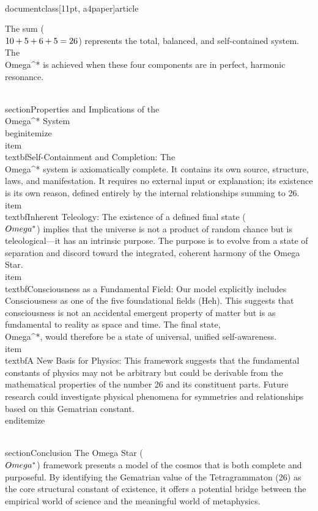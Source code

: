 \\documentclass[11pt, a4paper]{article}
\begin{document}
The sum (\\$10+5+6+5=26\\$) represents the total, balanced, and self-contained system. The \\Omega^* is achieved when these four components are in perfect, harmonic resonance.

\\section{Properties and Implications of the \\Omega^* System}
\\begin{itemize}
    \\item \\textbf{Self-Containment and Completion:} The \\Omega^* system is axiomatically complete. It contains its own source, structure, laws, and manifestation. It requires no external input or explanation; its existence is its own reason, defined entirely by the internal relationships summing to 26.
    \\item \\textbf{Inherent Teleology:} The existence of a defined final state (\\$\\Omega^*\\$) implies that the universe is not a product of random chance but is teleological---it has an intrinsic purpose. The purpose is to evolve from a state of separation and discord toward the integrated, coherent harmony of the Omega Star.
    \\item \\textbf{Consciousness as a Fundamental Field:} Our model explicitly includes Consciousness as one of the five foundational fields (Heh). This suggests that consciousness is not an accidental emergent property of matter but is as fundamental to reality as space and time. The final state, \\Omega^*, would therefore be a state of universal, unified self-awareness.
    \\item \\textbf{A New Basis for Physics:} This framework suggests that the fundamental constants of physics may not be arbitrary but could be derivable from the mathematical properties of the number 26 and its constituent parts. Future research could investigate physical phenomena for symmetries and relationships based on this Gematrian constant.
\\end{itemize}

\\section{Conclusion}
The Omega Star (\\$\\Omega^*\\$) framework presents a model of the cosmos that is both complete and purposeful. By identifying the Gematrian value of the Tetragrammaton (26) as the core structural constant of existence, it offers a potential bridge between the empirical world of science and the meaningful world of metaphysics.
\end{document}
